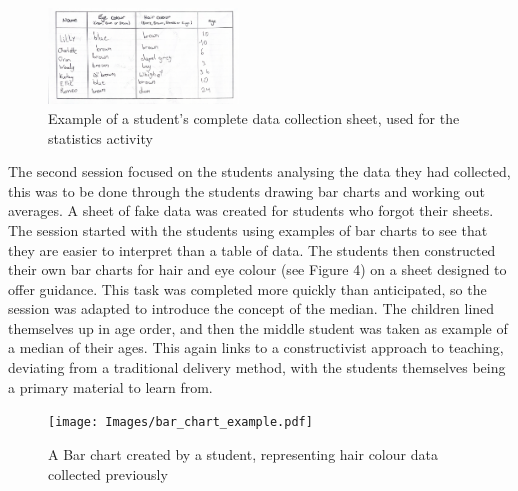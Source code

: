 \documentclass[11pt, a4paper, notitlepage]{article}
\begin{document}
\begin{figure}[htbp]
    \centering
    \includegraphics[width=0.45\textwidth]{Images/data_collection_example.pdf}
    \caption{Example of a student's complete data collection sheet, used for the statistics activity}
\end{figure}

\par
\vspace{1em}
The second session focused on the students analysing the data they had collected, this was to be done through the students drawing bar charts and working out averages. A sheet of fake data was created for students who forgot their sheets. The session started with the students using examples of bar charts to see that they are easier to interpret than a table of data. The students then constructed their own bar charts for hair and eye colour (see Figure 4) on a sheet designed to offer guidance. This task was completed more quickly than anticipated, so the session was adapted to introduce the concept of the  median. The children lined themselves up in age order, and then the middle student was taken as example of a median of their ages. This again links to a constructivist approach to teaching, deviating from a traditional delivery method, with the students themselves being a primary material to learn from.

\begin{figure}[htbp]
    \centering
    \texttt{[image: Images/bar\_chart\_example.pdf]}
    \caption{A Bar chart created by a student, representing hair colour data collected previously}
\end{figure}
\end{document}
